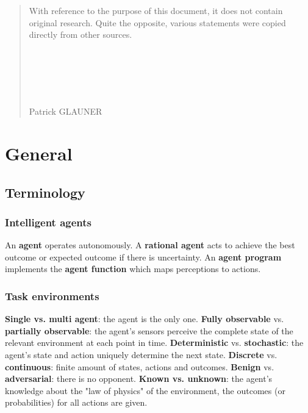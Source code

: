 \documentclass{report}
\begin{document}
\begin{abstract}
With reference to the purpose of this document, it does not contain original research. Quite the opposite, various statements were copied directly from other sources.

~\\~\\~\\~\\
\begin{flushright}
Patrick GLAUNER
\end{flushright}

\end{abstract}


\chapter{General}
\section{Terminology}
\subsection{Intelligent agents}
An {\bf agent} operates autonomously. A {\bf rational agent} acts to achieve the best outcome or expected outcome if there is uncertainty. An {\bf agent program} implements the {\bf agent function} which maps perceptions to actions.

\subsection{Task environments}
{\bf Single vs. multi agent}: the agent is the only one. {\bf Fully observable} vs. {\bf partially observable}: the agent's sensors perceive the complete state of the relevant environment at each point in time. {\bf Deterministic} vs. {\bf stochastic}: the agent's state and action uniquely determine the next state. {\bf Discrete} vs. {\bf continuous}: finite amount of states, actions and outcomes. {\bf Benign} vs. {\bf adversarial}: there is no opponent. {\bf Known vs. unknown}: the agent's knowledge about the "law of physics" of the environment, the outcomes (or probabilities) for all actions are given.
\end{document}
